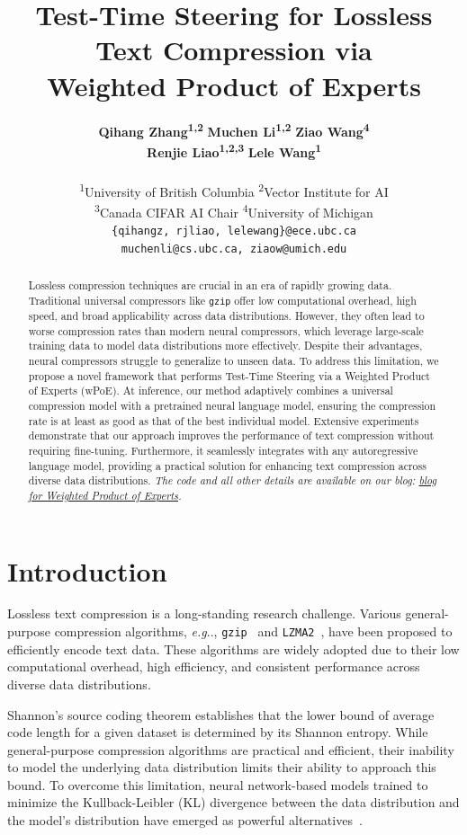 \documentclass[11pt]{article}
\title{Test-Time Steering for Lossless Text Compression via \\ Weighted Product of Experts}
\author{
 \textbf{Qihang Zhang\textsuperscript{1,2}}\quad \quad
 \textbf{Muchen Li\textsuperscript{1,2}}\quad \quad
 \textbf{Ziao Wang\textsuperscript{4}}\quad \quad
 \\
 \textbf{Renjie Liao\textsuperscript{1,2,3}}\quad \quad
 \textbf{Lele Wang\textsuperscript{1}}
\\
\\
 \textsuperscript{1}University of British Columbia \quad
 \textsuperscript{2}Vector Institute for AI 
 \\
 \textsuperscript{3}Canada CIFAR AI Chair
 \quad
 \textsuperscript{4}University of Michigan
\\
{\footnotesize
 \texttt{\{qihangz, rjliao, lelewang\}@ece.ubc.ca}
}\\
{\footnotesize
 \texttt{muchenli@cs.ubc.ca, ziaow@umich.edu}
}
}
\makeatletter
\DeclareRobustCommand\onedot{\futurelet\@let@token\@onedot}
\def\@onedot{\ifx\@let@token.\else.\null\fi\xspace}
\def\eg{\emph{e.g}\onedot} \def\Eg{\emph{E.g}\onedot}
\makeatother
\begin{document}
\maketitle
\begin{abstract} 
Lossless compression techniques are crucial in an era of rapidly growing data. 
Traditional universal compressors like \texttt{gzip} offer low computational overhead, high speed, and broad applicability across data distributions. 
However, they often lead to worse compression rates than modern neural compressors, which leverage large-scale training data to model data distributions more effectively. 
Despite their advantages, neural compressors struggle to generalize to unseen data. 
To address this limitation, we propose a novel framework that performs Test-Time Steering via a Weighted Product of Experts (wPoE). 
At inference, our method adaptively combines a universal compression model with a pretrained neural language model, ensuring the compression rate is at least as good as that of the best individual model. 
Extensive experiments demonstrate that our approach improves the performance of text compression without requiring fine-tuning. 
Furthermore, it seamlessly integrates with any autoregressive language model, providing a practical solution for enhancing text compression across diverse data distributions. \textit{The code and all other details are available on our blog: \href{https://qihang-zhang.com/Learning-Sys-Blog/2025/10/15/weighted-product-of-experts.html}{blog for Weighted Product of Experts}.}
\end{abstract}
\section{Introduction}

Lossless text compression is a long-standing research challenge. Various general-purpose compression algorithms, \eg, \texttt{gzip}~\cite{gzip} and \texttt{LZMA2}~\cite{lzma2}, have been proposed to efficiently encode text data. 
These algorithms are widely adopted due to their low computational overhead, high efficiency, and consistent performance across diverse data distributions.

Shannon's source coding theorem \cite{shannon1948mathematical} establishes that the lower bound of average code length for a given dataset is determined by its Shannon entropy. 
While general-purpose compression algorithms are practical and efficient, their inability to model the underlying data distribution limits their ability to approach this bound. 
To overcome this limitation, neural network-based models trained to minimize the Kullback-Leibler (KL) divergence between the data distribution and the model's distribution have emerged as powerful alternatives~\citep{NNCP,lmic,llmzip}.
\end{document}

